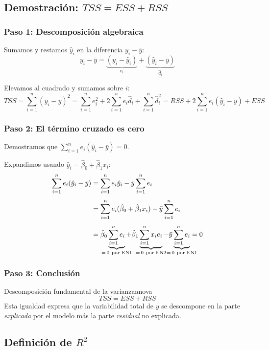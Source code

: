 \documentclass[12pt, a4paper]{article}
\newcommand{\hbeta}{\hat{\beta}}
\newcommand{\hy}{\hat{y}}
\newcommand{\sumni}{\sum_{i=1}^{n}}
\begin{document}
\subsection{Demostración: $TSS = ESS + RSS$}

\subsubsection*{Paso 1: Descomposición algebraica}

Sumamos y restamos $\hy_i$ en la diferencia $y_i - \bar{y}$:
\[
  y_i - \bar{y}
    = \underbrace{(y_i - \hy_i)}_{e_i}
    + \underbrace{(\hy_i - \bar{y})}_{\hat{d}_i}
\]

Elevamos al cuadrado y sumamos sobre $i$:
\[
  TSS
    = \sumni(y_i-\bar{y})^2
    = \sumni e_i^2 + 2\sumni e_i\hat{d}_i + \sumni\hat{d}_i^2
    = RSS + 2\sumni e_i(\hy_i-\bar{y}) + ESS
\]

\subsubsection*{Paso 2: El término cruzado es cero}

Demostramos que $\displaystyle\sumni e_i(\hy_i - \bar{y}) = 0$.

Expandimos usando $\hy_i = \hbeta_0 + \hbeta_1 x_i$:
\begin{align*}
  \sumni e_i(\hy_i-\bar{y})
    &= \sumni e_i\hy_i - \bar{y}\sumni e_i\\[4pt]
    &= \sumni e_i(\hbeta_0 + \hbeta_1 x_i) - \bar{y}\sumni e_i\\[4pt]
    &= \hbeta_0\underbrace{\sumni e_i}_{\mathclap{=\,0\ \text{por EN1}}}
     + \hbeta_1\underbrace{\sumni x_i e_i}_{\mathclap{=\,0\ \text{por EN2}}}
     - \bar{y}\underbrace{\sumni e_i}_{\mathclap{=\,0\ \text{por EN1}}}
    = 0
\end{align*}

\subsubsection*{Paso 3: Conclusión}

\begin{resultado}{Descomposición fundamental de la varianza}{anova}
\[
  \boxed{TSS = ESS + RSS}
\]
Esta igualdad expresa que la variabilidad total de $y$ se descompone en la
parte \emph{explicada} por el modelo más la parte \emph{residual} no explicada.
\end{resultado}

\subsection{Definición de $R^2$}
\end{document}
